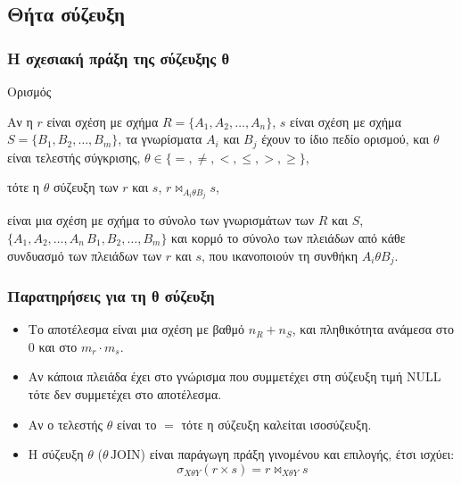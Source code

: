 \subsection[{\en theta}]{\textgreek{Θήτα σύζευξη}}


\begin{frame}
\frametitle{Η σχεσιακή πράξη της σύζευξης θ}
\begin{minipage}{\wE}
  \begin{block}{Ορισμός}
    \par Αν η $r$ είναι σχέση με σχήμα $R=\{A_1, A_2, \ldots, A_n\}$,
    $s$ είναι σχέση
    με σχήμα $S=\{B_1, B_2, \ldots, B_m\}$,
    τα γνωρίσματα $A_i$ και $B_j$ έχουν το ίδιο πεδίο ορισμού,
    και $\theta$ είναι τελεστής σύγκρισης, $\theta \in \{=,\neq,<,\leq,>,\geq\}$, 
    \par τότε η $\theta$ σύζευξη των $r$ και $s$, $r \bowtie_{A_i \theta B_j} s$,
    \par είναι μια σχέση με σχήμα
    το σύνολο των γνωρισμάτων των $R$ και $S$, $\{A_1, A_2, \ldots, A_n\, B_1, B_2, \ldots, B_m\}$
    και κορμό το σύνολο των πλειάδων από κάθε συνδυασμό των πλειάδων των $r$ και $s$,
    που ικανοποιούν τη συνθήκη $A_i \theta B_j$.
  \end{block}
\end{minipage}
\end{frame}



\begin{frame}
\frametitle{Παρατηρήσεις για τη θ σύζευξη}
\begin{minipage}{\wE}
  \begin{itemize}   \itemsep6pt
    \item Το αποτέλεσμα είναι μια σχέση με βαθμό $n_R+n_S$,
          και πληθικότητα ανάμεσα στο 0 και στο $m_r \cdot m_s$.
    \item Αν κάποια πλειάδα έχει στο γνώρισμα που συμμετέχει
          στη σύζευξη  τιμή {\sq NULL} τότε δεν συμμετέχει στο αποτέλεσμα.
    \item Αν ο τελεστής $\theta$ είναι το $=$ τότε η σύζευξη καλείται {\bb ισοσύζευξη}.
    \item Η σύζευξη $\theta$ ($\theta\, \mathrm{JOIN}$) είναι παράγωγη πράξη γινομένου και επιλογής,
          έτσι ισχύει: \\
          {\Large \[ \sigma_{X \theta Y}(r \times s) = r \bowtie_{X \theta Y} s \]  }
  \end{itemize}
\end{minipage}
\end{frame}



